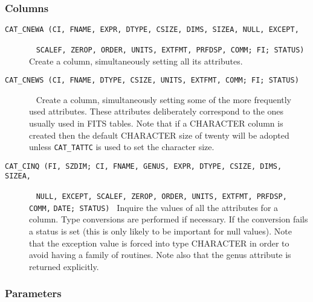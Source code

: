 \documentclass[11pt,twoside]{starlink}
\begin{document}
\subsubsection{\label{SUBINT_COL}Columns}

\begin{description}

  \item[ \texttt{CAT\_CNEWA (CI, FNAME, EXPR, DTYPE,
   CSIZE, DIMS, SIZEA, NULL, EXCEPT, } ] ~
  \newline \texttt{SCALEF, ZEROP, ORDER, UNITS, EXTFMT, PRFDSP, COMM;
   FI; STATUS) }
  \newline Create a column, simultaneously setting all its attributes.

  \item[ \texttt{CAT\_CNEWS (CI, FNAME, DTYPE, CSIZE, UNITS, EXTFMT, COMM;
   FI; STATUS)} ] ~
  \newline Create a column, simultaneously setting some of the more
   frequently used attributes. These attributes deliberately correspond
   to the ones usually used in FITS tables. Note that if a CHARACTER
   column is created then the default CHARACTER size of twenty will be
   adopted unless \texttt{CAT\_TATTC} is used to set the character size.

  \item[ \texttt{CAT\_CINQ (FI, SZDIM; CI, FNAME, GENUS, EXPR, DTYPE,
   CSIZE, DIMS, SIZEA, } ] ~
  \newline \texttt{NULL, EXCEPT, SCALEF, ZEROP, ORDER, UNITS, EXTFMT,
   PRFDSP, COMM,}
  \newline \texttt{DATE; STATUS) }
  \newline Inquire the values of all the attributes for a column. Type
   conversions are performed if necessary. If the conversion fails a
   status is set (this is only likely to be important for null values).
   Note that the exception value is forced into type CHARACTER in order
   to avoid having a family of routines. Note also that the genus
   attribute is returned explicitly.

\end{description}

\subsubsection{\label{SUBINT_PAR}Parameters}
\end{document}
